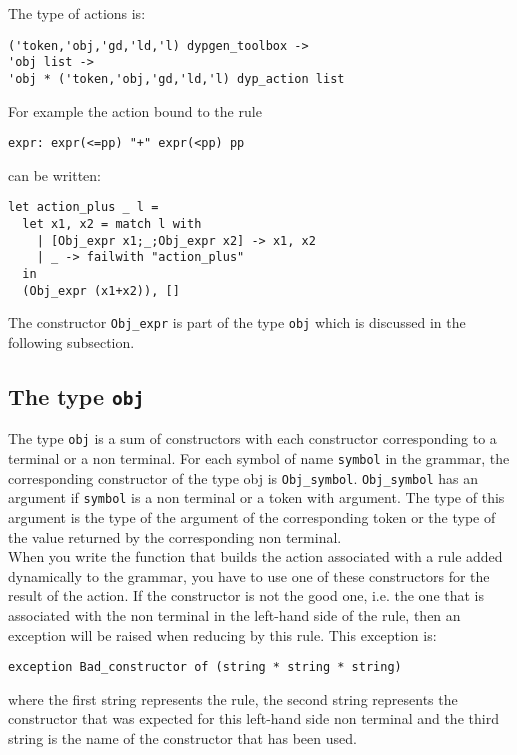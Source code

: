 \documentclass[12pt]{article}
\begin{document}
{The type of actions is:
\begin{verbatim}
('token,'obj,'gd,'ld,'l) dypgen_toolbox ->
'obj list ->
'obj * ('token,'obj,'gd,'ld,'l) dyp_action list
\end{verbatim}

For example the action bound to the rule
\begin{verbatim}
expr: expr(<=pp) "+" expr(<pp) pp
\end{verbatim}
can be written:
\begin{verbatim}
let action_plus _ l =
  let x1, x2 = match l with
    | [Obj_expr x1;_;Obj_expr x2] -> x1, x2
    | _ -> failwith "action_plus"
  in
  (Obj_expr (x1+x2)), []
\end{verbatim}
The constructor \verb|Obj_expr| is part of the type \verb|obj| which is discussed in the following subsection.

\subsection{The type \texttt{obj}}\label{obj}

The type \texttt{obj} is a sum of constructors with each constructor corresponding to a terminal or a non terminal. For each symbol of name \texttt{symbol} in the grammar, the corresponding constructor of the type obj is \texttt{Obj\_symbol}. \texttt{Obj\_symbol} has an argument if \texttt{symbol} is a non terminal or a token with argument. The type of this argument is the type of the argument of the corresponding token or the type of the value returned by the corresponding non terminal.\\

When you write the function that builds the action associated with a rule added dynamically to the grammar, you have to use one of these constructors for the result of the action. If the constructor is not the good one, i.e. the one that is associated with the non terminal in the left-hand side of the rule, then an exception will be raised when reducing by this rule. This exception is:
\begin{verbatim}
exception Bad_constructor of (string * string * string)
\end{verbatim}
where the first string represents the rule, the second string represents the constructor that was expected for this left-hand side non terminal and the third string is the name of the constructor that has been used.\\

}
\end{document}
